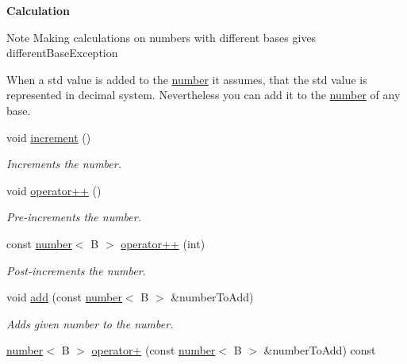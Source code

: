 \begin{Indent}{\bf Calculation}\par
{\em \begin{DoxyNote}{Note}
Making calculations on numbers with different bases gives different\-Base\-Exception 

When a std value is added to the \hyperlink{classcjr_1_1number}{number} it assumes, that the std value is represented in decimal system. Nevertheless you can add it to the \hyperlink{classcjr_1_1number}{number} of any base. 
\end{DoxyNote}
}\begin{DoxyCompactItemize}
\item 
\hypertarget{classcjr_1_1number_a314f5ddd4ea8b6e0ff752d9ca8f00a2a}{void \hyperlink{classcjr_1_1number_a314f5ddd4ea8b6e0ff752d9ca8f00a2a}{increment} ()}\label{classcjr_1_1number_a314f5ddd4ea8b6e0ff752d9ca8f00a2a}

\begin{DoxyCompactList}\small\item\em Increments the number. \end{DoxyCompactList}\item 
\hypertarget{classcjr_1_1number_af50a7633da47b4003ae722138717ecce}{void \hyperlink{classcjr_1_1number_af50a7633da47b4003ae722138717ecce}{operator++} ()}\label{classcjr_1_1number_af50a7633da47b4003ae722138717ecce}

\begin{DoxyCompactList}\small\item\em Pre-\/increments the number. \end{DoxyCompactList}\item 
\hypertarget{classcjr_1_1number_a6b6ef41013a16ea2a0cfebd5b9d99172}{const \hyperlink{classcjr_1_1number}{number}$<$ B $>$ \hyperlink{classcjr_1_1number_a6b6ef41013a16ea2a0cfebd5b9d99172}{operator++} (int)}\label{classcjr_1_1number_a6b6ef41013a16ea2a0cfebd5b9d99172}

\begin{DoxyCompactList}\small\item\em Post-\/increments the number. \end{DoxyCompactList}\item 
void \hyperlink{classcjr_1_1number_ac876a5bc8916d2ddb19a1d514ac3f5c0}{add} (const \hyperlink{classcjr_1_1number}{number}$<$ B $>$ \&number\-To\-Add)
\begin{DoxyCompactList}\small\item\em Adds given number to the number. \end{DoxyCompactList}\item 
\hypertarget{classcjr_1_1number_a3ead20a677d3bcd872895065fcfea6f7}{\hyperlink{classcjr_1_1number}{number}$<$ B $>$ \hyperlink{classcjr_1_1number_a3ead20a677d3bcd872895065fcfea6f7}{operator+} (const \hyperlink{classcjr_1_1number}{number}$<$ B $>$ \&number\-To\-Add) const }\label{classcjr_1_1number_a3ead20a677d3bcd872895065fcfea6f7}


\end{DoxyCompactItemize}
\end{Indent}
